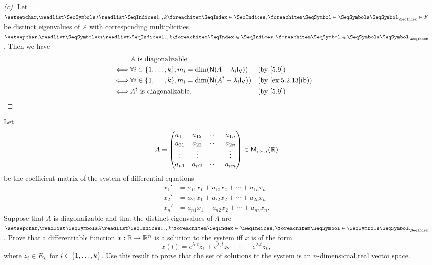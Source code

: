 \begin{proof}[(c)]
  Let \(\seq{\lambda}{1,,k} \in \F\) be distinct eigenvalues of \(A\) with corresponding multiplicities \(\seq{m}{1,,k}\).
  Then we have
  \begin{align*}
         & A \text{ is diagonalizable}                                                                                       \\
    \iff & \forall i \in \set{1, \dots, k}, m_i = \dim(\ns{A - \lambda_i \IT[\V]})      &  & \text{(by \cref{5.9})}          \\
    \iff & \forall i \in \set{1, \dots, k}, m_i = \dim(\ns{\tp{A} - \lambda_i \IT[\V]}) &  & \text{(by \cref{ex:5.2.13}(b))} \\
    \iff & \tp{A} \text{ is diagonalizable}.                                            &  & \text{(by \cref{5.9})}
  \end{align*}
\end{proof}

\setcounter{ex}{14}
\begin{ex}\label{ex:5.2.15}
  Let
  \[
    A = \begin{pmatrix}
      a_{1 1} & a_{1 2} & \cdots & a_{1 n} \\
      a_{2 1} & a_{2 2} & \cdots & a_{2 n} \\
      \vdots  & \vdots  &        & \vdots  \\
      a_{n 1} & a_{n 2} & \cdots & a_{n n}
    \end{pmatrix} \in \mathsf{M}_{{n} \times n}({\mathbb{R}})
  \]
  be the coefficient matrix of the system of differential equations
  \begin{align*}
    x_1' & = a_{1 1} x_1 + a_{1 2} x_2 + \cdots + a_{1 n} x_n  \\
    x_2' & = a_{2 1} x_1 + a_{2 2} x_2 + \cdots + a_{2 n} x_n  \\
    x_n' & = a_{n 1} x_1 + a_{n 2} x_2 + \cdots + a_{n n} x_n.
  \end{align*}
  Suppose that \(A\) is diagonalizable and that the distinct eigenvalues of \(A\) are \(\seq{\lambda}{1,,k}\).
  Prove that a differentiable function \(x : \mathbb{R} \to \mathbb{R}^n\) is a solution to the system iff \(x\) is of the form
  \[
    x(t) = e^{\lambda_1 t} z_1 + e^{\lambda_2 t} z_2 + \cdots + e^{\lambda_k t} z_k,
  \]
  where \(z_i \in E_{\lambda_i}\) for \(i \in \left\lbrace1, \dots, k\right\rbrace\).
  Use this result to prove that the set of solutions to the system is an \(n\)-dimensional real vector space.
\end{ex}

